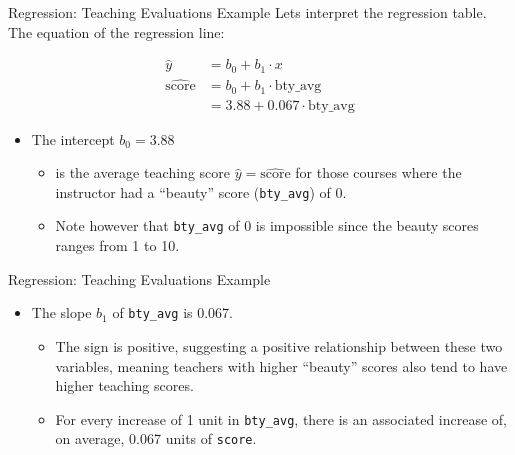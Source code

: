 \documentclass[
  ignorenonframetext,
]{beamer}
\providecommand{\tightlist}{%
  \setlength{\itemsep}{0pt}\setlength{\parskip}{0pt}}
\begin{document}
\begin{frame}[fragile]{Regression: Teaching Evaluations Example}
\protect{}\label{regression-teaching-evaluations-example-5}
Lets interpret the regression table. The equation of the regression
line:

\[
\begin{aligned}
\hat{y} &= b_0 +b_1\cdot x \\
\widehat{\text{score}} &= b_0 + b_1\cdot{\text{bty\_avg}}\\
&= 3.88 + 0.067\cdot\text{bty\_avg}
\end{aligned}
\]

\begin{itemize}
\item
  The intercept \(b_0 = 3.88\)

  \begin{itemize}
  \tightlist
  \item
    is the average teaching score \(\hat{y}=\widehat{\text{score}}\) for
    those courses where the instructor had a ``beauty'' score
    (\texttt{bty\_avg}) of 0.
  \item
    Note however that \texttt{bty\_avg} of 0 is impossible since the
    beauty scores ranges from 1 to 10.
  \end{itemize}
\end{itemize}
\end{frame}

\begin{frame}[fragile]{Regression: Teaching Evaluations Example}
\protect{}\label{regression-teaching-evaluations-example-6}
\begin{itemize}
\item
  The slope \(b_1\) of \texttt{bty\_avg} is 0.067.

  \begin{itemize}
  \tightlist
  \item
    The sign is positive, suggesting a positive relationship between
    these two variables, meaning teachers with higher ``beauty'' scores
    also tend to have higher teaching scores.
  \item
    For every increase of 1 unit in \texttt{bty\_avg}, there is an
    associated increase of, on average, 0.067 units of \texttt{score}.
  \end{itemize}
\end{itemize}
\end{frame}
\end{document}
